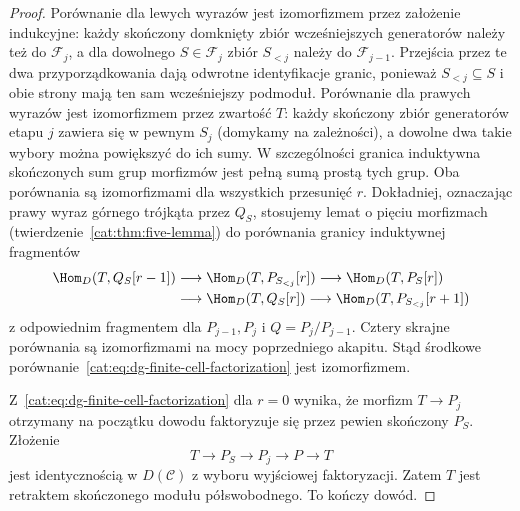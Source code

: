\begin{proof}
Porównanie dla lewych wyrazów jest izomorfizmem przez założenie indukcyjne: każdy skończony domknięty zbiór wcześniejszych generatorów należy też do $\mathscr F_j$, a dla dowolnego $S\in\mathscr F_j$ zbiór $S_{<j}$ należy do $\mathscr F_{j-1}$. Przejścia przez te dwa przyporządkowania dają odwrotne identyfikacje granic, ponieważ $S_{<j}\subseteq S$ i obie strony mają ten sam wcześniejszy podmoduł. Porównanie dla prawych wyrazów jest izomorfizmem przez zwartość $T$: każdy skończony zbiór generatorów etapu $j$ zawiera się w pewnym $S_j$ (domykamy na zależności), a dowolne dwa takie wybory można powiększyć do ich sumy. W szczególności granica induktywna skończonych sum grup morfizmów jest pełną sumą prostą tych grup. Oba porównania są izomorfizmami dla wszystkich przesunięć $r$. Dokładniej, oznaczając prawy wyraz górnego trójkąta przez $Q_S$, stosujemy lemat o pięciu morfizmach (twierdzenie~\ref{cat:thm:five-lemma}) do porównania granicy induktywnej fragmentów
\[
\begin{aligned}
 \Hom_D(T,Q_S[r-1])&\longrightarrow\Hom_D(T,P_{S_{<j}}[r])
 \longrightarrow\Hom_D(T,P_S[r])\\
 &\longrightarrow\Hom_D(T,Q_S[r])
 \longrightarrow\Hom_D(T,P_{S_{<j}}[r+1])
\end{aligned}
\]
z odpowiednim fragmentem dla $P_{j-1},P_j$ i $Q=P_j/P_{j-1}$. Cztery skrajne porównania są izomorfizmami na mocy poprzedniego akapitu. Stąd środkowe porównanie~\eqref{cat:eq:dg-finite-cell-factorization} jest izomorfizmem.

Z~\eqref{cat:eq:dg-finite-cell-factorization} dla $r=0$ wynika, że morfizm $T\to P_j$ otrzymany na początku dowodu faktoryzuje się przez pewien skończony $P_S$. Złożenie
\[
 T\longrightarrow P_S\longrightarrow P_j
 \longrightarrow P\longrightarrow T
\]
jest identycznością w $D(\mathcal C)$ z wyboru wyjściowej faktoryzacji. Zatem $T$ jest retraktem skończonego modułu półswobodnego. To kończy dowód.
\end{proof}

